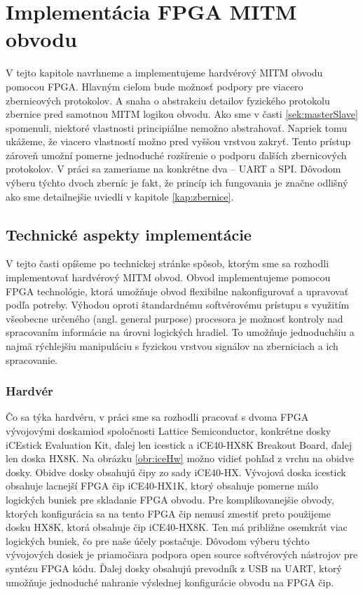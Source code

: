 \chapter{Implementácia FPGA MITM obvodu}
\label{kap:implementacia}

V tejto kapitole navrhneme a implementujeme hardvérový MITM obvodu pomocou FPGA. Hlavným cieľom bude možnosť podpory pre viacero zbernicových protokolov. A snaha o abstrakciu detailov fyzického protokolu zbernice pred samotnou MITM logikou obvodu. Ako sme v časti \ref{sek:masterSlave} spomenuli, niektoré vlastnosti principiálne nemožno abstrahovať. Napriek tomu ukážeme, že viacero vlastností možno pred vyššou vrstvou zakryť. Tento prístup zároveň umožní pomerne jednoduché rozšírenie o podporu ďalších zbernicových protokolov. V práci sa zameriame na konkrétne dva -- UART a SPI. Dôvodom výberu týchto dvoch zberníc je fakt, že princíp ich fungovania je značne odlišný ako sme detailnejšie uviedli v kapitole \ref{kap:zbernice}.

\section{Technické aspekty implementácie}
V tejto časti opíšeme po technickej stránke spôsob, ktorým sme sa rozhodli implementovať hardvérový MITM obvod. Obvod implementujeme pomocou FPGA technológie, ktorá umožňuje obvod flexibilne nakonfigurovať a upravovať podľa potreby. Výhodou oproti štandardnému softvérovému prístupu s využitím všeobecne určeného (angl. general purpose) procesora je možnosť kontroly nad spracovaním informácie na úrovni logických hradiel. To umožňuje jednoduchšiu a najmä rýchlejšiu manipuláciu s fyzickou vrstvou signálov na zberniciach a ich spracovanie.

\subsection{Hardvér}
Čo sa týka hardvéru, v práci sme sa rozhodli pracovať s dvoma FPGA vývojovými doskamiod spoločnosti Lattice Semiconductor, konkrétne dosky iCEstick Evaluation Kit, ďalej len icestick a iCE40-HX8K Breakout Board, ďalej len doska HX8K. Na obrázku \ref{obr:iceHw} možno vidieť pohľad z vrchu na obidve dosky. Obidve dosky obsahujú čipy zo sady iCE40-HX. Vývojová doska icestick obsahuje lacnejší FPGA čip iCE40-HX1K, ktorý obsahuje pomerne málo logických buniek pre skladanie FPGA obvodu. Pre komplikovanejšie obvody, ktorých konfigurácia sa na tento FPGA čip nemusí zmestiť preto použijeme dosku HX8K, ktorá obsahuje čip iCE40-HX8K. Ten má približne osemkrát viac logických buniek, čo pre naše účely postačuje. Dôvodom výberu týchto vývojových dosiek je priamočiara podpora open source softvérových nástrojov pre syntézu FPGA kódu. Ďalej dosky obsahujú prevodník z USB na UART, ktorý umožňuje jednoduché nahranie výslednej konfigurácie obvodu na FPGA čip.

